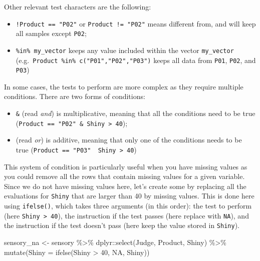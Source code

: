 \documentclass[
]{krantz}
\makeatletter
\newenvironment{Shaded}{\begin{snugshade}}{\end{snugshade}}
\newcommand{\AttributeTok}[1]{\textcolor[rgb]{0.61,0.61,0.61}{#1}}
\newcommand{\ConstantTok}[1]{\textcolor[rgb]{0,0,0}{#1}}
\newcommand{\DecValTok}[1]{\textcolor[rgb]{0.06,0.06,0.06}{#1}}
\newcommand{\FunctionTok}[1]{\textcolor[rgb]{0,0,0}{#1}}
\newcommand{\NormalTok}[1]{#1}
\newcommand{\OtherTok}[1]{\textcolor[rgb]{0.37,0.37,0.37}{#1}}
\newcommand{\SpecialCharTok}[1]{\textcolor[rgb]{0,0,0}{#1}}
\providecommand{\tightlist}{%
  \setlength{\itemsep}{0pt}\setlength{\parskip}{0pt}}
\newenvironment{kframe}{%
\medskip{}
\setlength{\fboxsep}{.8em}
 \def\at@end@of@kframe{}%
 \ifinner\ifhmode%
  \def\at@end@of@kframe{\end{minipage}}%
  \begin{minipage}{\columnwidth}%
 \fi\fi%
 \def\FrameCommand##1{\hskip\@totalleftmargin \hskip-\fboxsep
 \colorbox{shadecolor}{##1}\hskip-\fboxsep
     \hskip-\linewidth \hskip-\@totalleftmargin \hskip\columnwidth}%
 \MakeFramed {\advance\hsize-\width
   \@totalleftmargin\z@ \linewidth\hsize
   \@setminipage}}%
 {\par\unskip\endMakeFramed%
 \at@end@of@kframe}
\renewenvironment{Shaded}{\begin{kframe}}{\end{kframe}}
\makeatother
\begin{document}
Other relevant test characters are the following:

\begin{itemize}
\tightlist
\item
  \texttt{!Product\ ==\ "P02"} or \texttt{Product\ !=\ "P02"} means different from, and will keep all samples except \texttt{P02};
\item
  \texttt{\%in\%\ my\_vector} keeps any value included within the vector \texttt{my\_vector} (e.g.~\texttt{Product\ \%in\%\ c("P01","P02","P03")} keeps all data from \texttt{P01}, \texttt{P02}, and \texttt{P03})
\end{itemize}

In some cases, the tests to perform are more complex as they require multiple conditions.
There are two forms of conditions:

\begin{itemize}
\tightlist
\item
  \texttt{\&} (read \emph{and}) is multiplicative, meaning that all the conditions need to be true (\texttt{Product\ ==\ "P02"\ \&\ Shiny\ \textgreater{}\ 40});
\item
  \texttt{\textbar{}} (read \emph{or}) is additive, meaning that only one of the conditions needs to be true (\texttt{Product\ ==\ "P03"\ \textbar{}\ Shiny\ \textgreater{}\ 40})
\end{itemize}

This system of condition is particularly useful when you have missing values as you could remove all the rows that contain missing values for a given variable. Since we do not have missing values here, let's create some by replacing all the evaluations for \texttt{Shiny} that are larger than 40 by missing values. This is done here using \texttt{ifelse()}, which takes three arguments (in this order): the test to perform (here \texttt{Shiny\ \textgreater{}\ 40}), the instruction if the test passes (here replace with \texttt{NA}), and the instruction if the test doesn't pass (here keep the value stored in \texttt{Shiny}).

\begin{Shaded}
\begin{Highlighting}[]
\NormalTok{sensory\_na }\OtherTok{\textless{}{-}}\NormalTok{ sensory }\SpecialCharTok{\%\textgreater{}\%}
\NormalTok{  dplyr}\SpecialCharTok{::}\FunctionTok{select}\NormalTok{(Judge, Product, Shiny) }\SpecialCharTok{\%\textgreater{}\%}
  \FunctionTok{mutate}\NormalTok{(}\AttributeTok{Shiny =} \FunctionTok{ifelse}\NormalTok{(Shiny }\SpecialCharTok{\textgreater{}} \DecValTok{40}\NormalTok{, }\ConstantTok{NA}\NormalTok{, Shiny))}
\end{Highlighting}
\end{Shaded}
\end{document}
